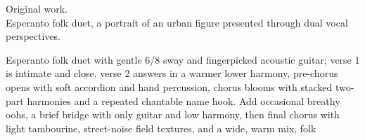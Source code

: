 

\begin{notes}
Original work.\\
Esperanto folk duet, a portrait of an urban figure presented through dual vocal perspectives.
\end{notes}

\begin{style}
Esperanto folk duet with gentle 6/8 sway and fingerpicked acoustic guitar; verse 1 is intimate and close, verse 2 answers in a warmer lower harmony, pre-chorus opens with soft accordion and hand percussion, chorus blooms with stacked two-part harmonies and a repeated chantable name hook. %
Add occasional breathy oohs, a brief bridge with only guitar and low harmony, then final chorus with light tambourine, street-noise field textures, and a wide, warm mix, folk
\end{style}


